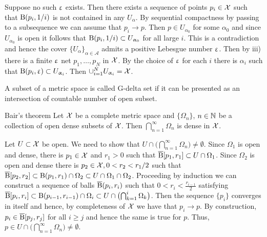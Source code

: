 Suppose no such $\upvarepsilon$ exists. Then there exists a sequence of points $p_i\in\spc{X}$ such that $\mathrm{B}{}(p_i,1/i)$ is not contained in any $U_\alpha$. By sequential compactness by passing to a subsequence we can assume that $p_i\to p$. Then $p\in U_{\alpha_0}$ for some $\alpha_0$ and since $U_{\alpha_0}$ is open it follows that $\oBall(p_i,1/i)\subset U_{\alpha_0}$ for all large $i$. This is a contradiction and hence the cover $\{U_\alpha\}_{\alpha\in\mathcal A}$ admits  a positive Lebesgue number $\upvarepsilon$. Then by iii) there is a finite $\upvarepsilon$ net $p_1,\ldots,p_{N}$ in $\mathcal{X}$. By the choice of $\upvarepsilon$ for each $i$ there is $\alpha_i$ such that
$\oBall(p_i,\eps)\subset U_{\alpha_i}$. Then $\cup_{i=1}^NU_{\alpha_i}=\spc{X}$.
\qeds 



A subset of a metric space is called G-delta set if it can be presented as an intersection of countable number of open subset.

\begin{thm}{Bair's theorem}
Let $\mathcal{X}$ be a complete metric space 
and $\{\Omega_n\}$, $n\in \NN$ be a collection of open dense subsets of $\mathcal{X}$.
Then $\bigcap_{n=1}^\infty\Omega_n$ is dense in $\mathcal{X}$.
\end{thm}

Let $U\subset\spc{X}$ be open. We need to show that $U\cap\bigl(\bigcap_{n=1}^\infty\Omega_n\bigr)\ne\emptyset$. Since $\Omega_1$ is open and dense, there is $p_1\in\spc{X}$ and $r_1>0$ such that $\cBall[p_1,r_1]\subset  U\cap \Omega_1$. Since $\Omega_2$ is open and dense there is $p_2\in\spc{X},0<r_2<r_1/2$ such that $\cBall[p_2,r_2]\subset \oBall(p_1,r_1)\cap \Omega_2\subset U\cap\Omega_1\cap\Omega_2$. Proceeding by induction we can construct a sequence of balls $\overline{\mathrm{B}}{}(p_i,r_i)$ such that $0<r_i<\frac {r_{i-1}}{2}$ satisfying  $\cBall[p_i,r_i]\subset \oBall(p_{i-1},r_{i-1})\cap \Omega_i\subset U\cap \bigl(\bigcap_{k=1}^i\Omega_k
 \bigr)$. Then the sequence $\{p_i\}$ converges in itself and hence, by completeness of $\mathcal{X}$ we have that $p_i\to p$. By construction, $p_i\in \cBall[p_j,r_j]$ for all $i\ge j$ and hence the same is true for $p$. Thus, $p\in U\cap\bigl(\bigcap_{n=1}^\infty\Omega_n\bigr)\ne\emptyset $. \qeds
 
